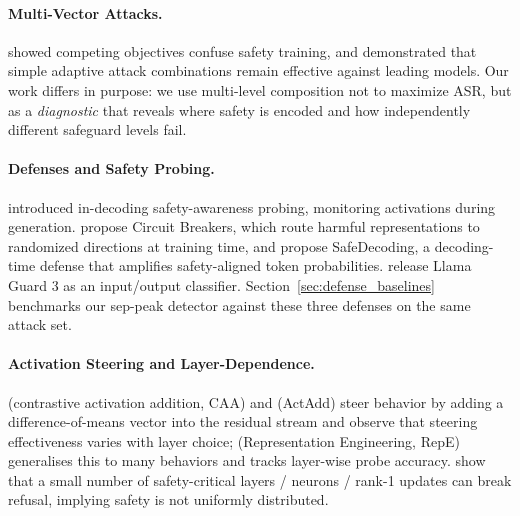 \documentclass{article}
\begin{document}
\paragraph{Multi-Vector Attacks.}
\citet{wei2023jailbroken} showed competing objectives confuse safety training, and \citet{andriushchenko2024adaptive} demonstrated that simple adaptive attack combinations remain effective against leading models. Our work differs in purpose: we use multi-level composition not to maximize ASR, but as a \textit{diagnostic} that reveals where safety is encoded and how independently different safeguard levels fail.

\paragraph{Defenses and Safety Probing.}
\citet{zhao2025indecoding} introduced in-decoding safety-awareness probing, monitoring activations during generation. \citet{zou2024circuit} propose Circuit Breakers, which route harmful representations to randomized directions at training time, and \citet{xu2024safedecoding} propose SafeDecoding, a decoding-time defense that amplifies safety-aligned token probabilities. \citet{llamaguard3} release Llama Guard 3 as an input/output classifier. Section~\ref{sec:defense_baselines} benchmarks our sep-peak detector against these three defenses on the same attack set.

\paragraph{Activation Steering and Layer-Dependence.}
\citet{panickssery2024caa} (contrastive activation addition, CAA) and \citet{turner2023activation} (ActAdd) steer behavior by adding a difference-of-means vector into the residual stream and observe that steering effectiveness varies with layer choice; \citet{zou2023representation} (Representation Engineering, RepE) generalises this to many behaviors and tracks layer-wise probe accuracy. \citet{wei2024brittleness} show that a small number of safety-critical layers / neurons / rank-1 updates can break refusal, implying safety is not uniformly distributed.
\end{document}
